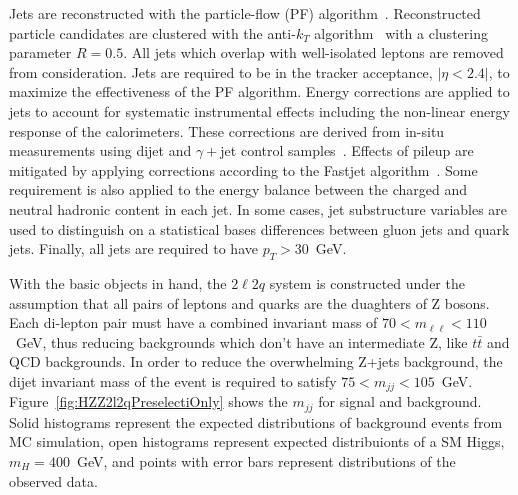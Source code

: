 Jets are reconstructed with the particle-flow (PF) algorithm~\cite{???}.
Reconstructed particle  candidates are clustered with the anti-$k_T$ 
algorithm~\cite{???} with a clustering parameter $R=0.5$.  All jets which 
overlap with well-isolated leptons are removed from consideration.  
Jets are required to be in the tracker acceptance, $|\eta<2.4|$, to maximize
the effectiveness of the PF algorithm.  Energy corrections  are applied
to jets to account for systematic instrumental effects including the 
non-linear energy response of the calorimeters.  These corrections are 
derived from in-situ measurements using dijet and $\gamma+$jet control
samples~\cite{???}.  Effects of pileup are mitigated by applying corrections
according to the Fastjet algorithm~\cite{???}.  Some requirement is also 
applied to the energy balance between the charged and neutral hadronic 
content in each jet.  In some cases, jet substructure variables are used
to distinguish on a statistical bases differences between gluon jets and
quark jets. Finally, all jets are required to have $p_T>30$~GeV.

With the basic objects in hand, the $2\ell2q$ system is constructed under
the assumption that all pairs of leptons and quarks are the duaghters of
Z bosons.  Each di-lepton pair must have a combined invariant mass of 
$70 < m_{\ell\ell} < 110$~GeV, thus reducing backgrounds which
don't have an intermediate Z, like $t\bar{t}$ and QCD backgrounds.  In order 
to reduce the overwhelming Z+jets background, the dijet invariant mass of 
the event is required to satisfy $75 < m_{jj} < 105$~GeV.  
Figure~\ref{fig:HZZ2l2qPreselectiOnly} shows the $m_{jj}$ for signal and background. 
Solid histograms represent the expected distributions of background events 
from MC simulation, open histograms represent expected distribuionts of 
a SM Higgs, $m_H=400$~GeV, and points with error bars represent distributions
of the observed data.

